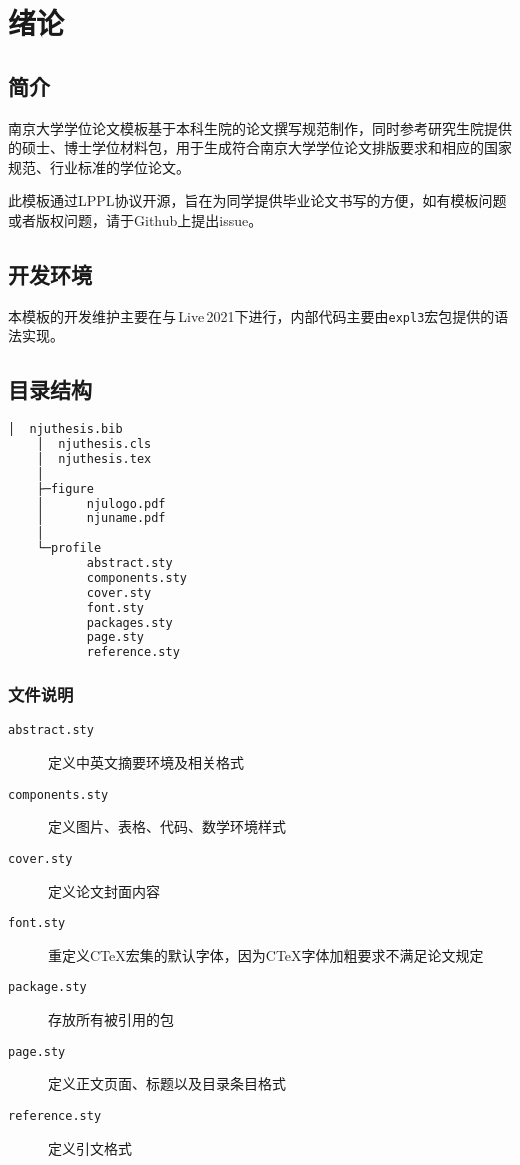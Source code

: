\chapter{绪论}

\section{简介}
南京大学学位论文模板\cite{njuthesis}基于本科生院的论文撰写规范制作，同时参考研究生院提供的硕士、博士学位材料包，用于生成符合南京大学学位论文排版要求和相应的国家规范、行业标准的学位论文。

此模板通过LPPL协议开源，旨在为同学提供毕业论文书写的方便，如有模板问题或者版权问题，请于Github上提出issue。

\section{开发环境}

本模板的开发维护主要在与\,Live\,2021下进行，内部代码主要由\lstinline|expl3|宏包提供的语法实现。

\section{目录结构}
\label{sec:directory}

\begin{lstlisting}[language=bash]
    │  njuthesis.bib
    │  njuthesis.cls
    │  njuthesis.tex
    │
    ├─figure
    │      njulogo.pdf
    │      njuname.pdf
    │
    └─profile
           abstract.sty
           components.sty
           cover.sty
           font.sty
           packages.sty
           page.sty
           reference.sty
\end{lstlisting}

\subsection{文件说明}
\begin{description}
    \item [\texttt{abstract.sty}] 定义中英文摘要环境及相关格式
    \item [\texttt{components.sty}] 定义图片、表格、代码、数学环境样式
    \item [\texttt{cover.sty}] 定义论文封面内容
    \item [\texttt{font.sty}] 重定义CTeX宏集的默认字体，因为CTeX字体加粗要求不满足论文规定
    \item [\texttt{package.sty}] 存放所有被引用的包
    \item [\texttt{page.sty}] 定义正文页面、标题以及目录条目格式
    \item [\texttt{reference.sty}] 定义引文格式
\end{description}

